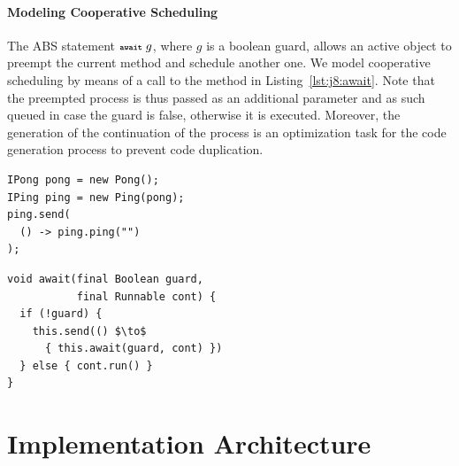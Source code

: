 \paragraph{Modeling Cooperative Scheduling}
The ABS statement $\textbf{\scriptsize\texttt{await}}\; g$, where $g$ is a boolean guard, allows an active object to preempt the current method and schedule another one.
We model cooperative scheduling by means of a call to the  method in Listing~\ref{lst:j8:await}.
Note that the preempted process is thus passed as an additional parameter and as such queued in case the guard is false,
otherwise it is executed.
Moreover, the generation of the continuation of the process is an optimization task for the code generation process to prevent code duplication.
\begin{center}
\begin{minipage}[t]{0.48\textwidth}
\begin{lstlisting}[mathescape,caption=main in ABS API,label=lst:main:api]
IPong pong = new Pong();
IPing ping = new Ping(pong);
ping.send(
  () -> ping.ping("")
);
\end{lstlisting}
\end{minipage}
\hfill
\begin{minipage}[t]{0.48\textwidth}
\begin{lstlisting}[mathescape,caption=Java~8 await implementation,label=lst:j8:await]
void await(final Boolean guard, 
           final Runnable cont) {
  if (!guard) { 
    this.send(() $\to$ 
      { this.await(guard, cont) })
  } else { cont.run() }
}
\end{lstlisting}
\end{minipage}
\end{center}





\section{Implementation Architecture}
\label{sec:impl:arch}

